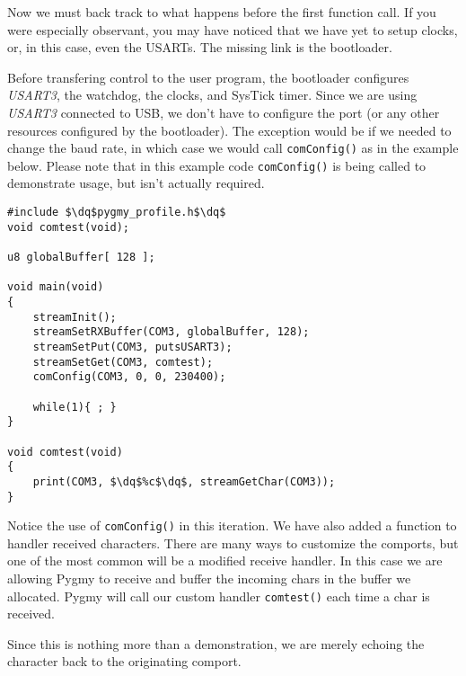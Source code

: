 \documentclass{article}
\newcommand{\dq}{\textquotedbl}
\begin{document}
Now we must back track to what happens before the first function call. If you were especially observant, you may have noticed that we have yet to setup clocks, or, in this case, even the USARTs. The missing link is the bootloader.

Before transfering control to the user program, the bootloader configures \emph{USART3}, the watchdog, the clocks, and SysTick timer. Since we are using \emph{USART3} connected to USB, we don't have to configure the port (or any other resources configured by the bootloader). The exception would be if we needed to change the baud rate, in which case we would call \verb|comConfig()| as in the example below. Please note that in this example code \verb|comConfig()| is being called to demonstrate usage, but isn't actually required.

\begin{lstlisting}
#include $\dq$pygmy_profile.h$\dq$
void comtest(void);

u8 globalBuffer[ 128 ];

void main(void)
{
	streamInit();
	streamSetRXBuffer(COM3, globalBuffer, 128);
	streamSetPut(COM3, putsUSART3);
	streamSetGet(COM3, comtest);
	comConfig(COM3, 0, 0, 230400);

	while(1){ ; }
}

void comtest(void)
{
	print(COM3, $\dq$%c$\dq$, streamGetChar(COM3));
}
\end{lstlisting}

Notice the use of \verb|comConfig()| in this iteration. We have also added a function to handler received characters. There are many ways to customize the comports, but one of the most common will be a modified receive handler. In this case we are allowing Pygmy to receive and buffer the incoming chars in the buffer we allocated. Pygmy will call our custom handler \verb|comtest()| each time a char is received.

Since this is nothing more than a demonstration, we are merely echoing the character back to the originating comport.
\end{document}
